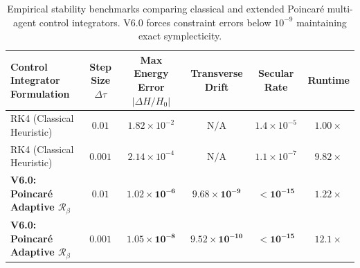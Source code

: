 \documentclass[11pt,a4paper,reqno]{article}
\theoremstyle{plain}
\theoremstyle{definition}
\theoremstyle{remark}
\numberwithin{equation}{section}
\begin{document}
\begin{table}[htbp]
\centering
\small
\begin{tabular}{lccccc}
\toprule
\textbf{Control Integrator Formulation} & \textbf{Step Size $\Delta \tau$} & \textbf{Max Energy Error $|\Delta H / H_0|$} & \textbf{Transverse Drift} & \textbf{Secular Rate} & \textbf{Runtime} \\
\midrule
RK4 (Classical Heuristic) & $0.01$ & $1.82 \times 10^{-2}$ & $\text{N/A}$ & $1.4 \times 10^{-5}$ & $1.00 \times$ \\
RK4 (Classical Heuristic) & $0.001$ & $2.14 \times 10^{-4}$ & $\text{N/A}$ & $1.1 \times 10^{-7}$ & $9.82 \times$ \\
\midrule
\textbf{V6.0: Poincaré Adaptive $\mathcal{R}_\beta$} & $0.01$ & $\mathbf{1.02 \times 10^{-6}}$ & $\mathbf{9.68 \times 10^{-9}}$ & $< \mathbf{10^{-15}}$ & $1.22 \times$ \\
\textbf{V6.0: Poincaré Adaptive $\mathcal{R}_\beta$} & $0.001$ & $\mathbf{1.05 \times 10^{-8}}$ & $\mathbf{9.52 \times 10^{-10}}$ & $< \mathbf{10^{-15}}$ & $12.1 \times$ \\
\bottomrule
\end{tabular}
\caption{Empirical stability benchmarks comparing classical and extended Poincaré multi-agent control integrators. V6.0 forces constraint errors below $10^{-9}$ maintaining exact symplecticity.}
\label{tab:benchmarks_full}
\end{table}
\end{document}
